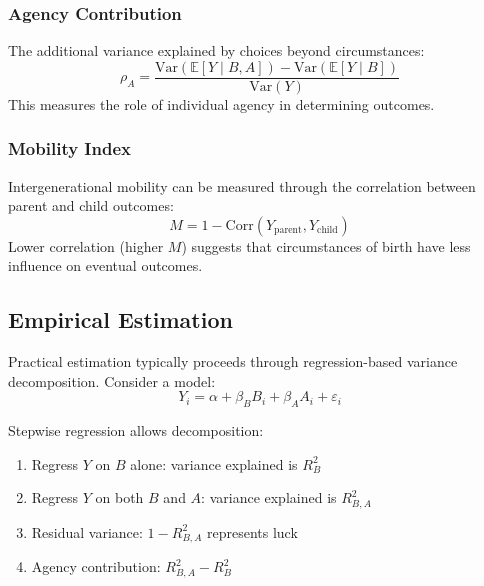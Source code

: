 \subsubsection{Agency Contribution}

The additional variance explained by choices beyond circumstances:
\begin{equation}
  \rho_{A}= \frac{\text{Var}(\mathbb{E}[Y \mid B, A]) - \text{Var}(\mathbb{E}[Y
  \mid B])}{\text{Var}(Y)}
\end{equation}
This measures the role of individual agency in determining outcomes.

\subsubsection{Mobility Index}

Intergenerational mobility can be measured through the correlation
between parent and child outcomes:
\begin{equation}
  M = 1 - \text{Corr}(Y_{\text{parent}}, Y_{\text{child}})
\end{equation}
Lower correlation (higher $M$) suggests that circumstances of birth have
less influence on eventual outcomes.

\subsection{Empirical Estimation}

Practical estimation typically proceeds through regression-based
variance decomposition. Consider a model:
\begin{equation}
  Y_{i}= \alpha + \beta_{B}B_{i}+ \beta_{A}A_{i}+ \varepsilon_{i}
\end{equation}

Stepwise regression allows decomposition:
\begin{enumerate}
  \item Regress $Y$ on $B$ alone: variance explained is $R^{2}_{B}$

  \item Regress $Y$ on both $B$ and $A$: variance explained is
    $R^{2}_{B,A}$

  \item Residual variance: $1 - R^{2}_{B,A}$ represents luck

  \item Agency contribution: $R^{2}_{B,A}- R^{2}_{B}$
\end{enumerate}

